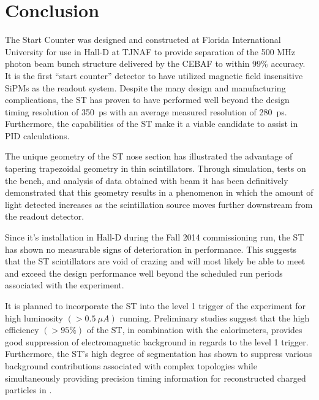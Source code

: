 \section{Conclusion} \label{sec:conclusion}

The \gx{} Start Counter was designed and constructed at Florida International University for use in Hall-D at TJNAF to provide separation of the 500 MHz photon beam bunch structure delivered by the CEBAF to within 99\% accuracy.  It is the first ``start counter'' detector to have utilized magnetic field insensitive SiPMs as the readout system.  Despite the many design and manufacturing complications, the ST has proven to have performed well beyond the design timing resolution of 350~ps with an average measured resolution of 280~ps.  Furthermore, the capabilities of the ST make it a viable candidate to assist in PID calculations.

The unique geometry of the ST nose section has illustrated the advantage of tapering trapezoidal geometry in thin scintillators.  Through simulation, tests on the bench, and analysis of data obtained with beam it has been definitively demonstrated that this geometry results in a phenomenon in which the amount of light detected increases as the scintillation source moves further downstream from the readout detector.

Since it's installation in Hall-D during the Fall 2014 commissioning run, the ST has shown no measurable signs of deterioration in performance.  This suggests that the ST scintillators are void of crazing and will most likely be able to meet and exceed the design performance well beyond the scheduled run periods associated with the \gx{} experiment.

It is planned to incorporate the ST into the level 1 trigger of the \gx{} experiment for high luminosity $(> 0.5\ \mu A)$ running.  Preliminary studies suggest that the high efficiency $(> 95\%)$ of the ST, in combination with the calorimeters, provides good suppression of electromagnetic background in regards to the level 1 trigger.  Furthermore, the ST's high degree of segmentation has shown to suppress various background contributions associated with complex topologies while simultaneously providing precision timing information for reconstructed charged particles in \gx{}.